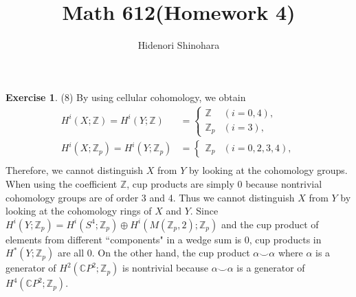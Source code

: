 \documentclass[12pt, psamsfonts]{amsart}
\theoremstyle{definition}
\newtheorem*{exer}{Exercise}
\theoremstyle{remark}
\numberwithin{equation}{section}
\begin{document}
\title{Math 612(Homework 4)}
\author{Hidenori Shinohara}
\maketitle

\begin{exer}{(8)}
  By using cellular cohomology, we obtain 
  \begin{align*}
    H^i(X; \mathbb{Z}) = H^i(Y; \mathbb{Z}) &= \begin{cases}
      \mathbb{Z} & (i = 0, 4), \\
      \mathbb{Z}_p & (i = 3),
    \end{cases} \\
    H^i(X; \mathbb{Z}_p) = H^i(Y; \mathbb{Z}_p) &= \begin{cases}
      \mathbb{Z}_p & (i = 0, 2, 3, 4),
    \end{cases} \\
  \end{align*}
  Therefore, we cannot distinguish $X$ from $Y$ by looking at the cohomology groups.
  When using the coefficient $\mathbb{Z}$, cup products are simply 0 because nontrivial cohomology groups are of order 3 and 4.
  Thus we cannot distinguish $X$ from $Y$ by looking at the cohomology rings of $X$ and $Y$.
  Since $H^i(Y; \mathbb{Z}_p) = H^i(S^4; \mathbb{Z}_p) \oplus H^i(M(\mathbb{Z}_p, 2); \mathbb{Z}_p)$ and the cup product of elements from different ``components" in a wedge sum is 0, cup products in $H^{\ast}(Y; \mathbb{Z}_p)$ are all 0.
  On the other hand, the cup product $\alpha \smile \alpha$ where $\alpha$ is a generator of $H^2(\mathbb{C}P^2; \mathbb{Z}_p)$ is nontrivial because $\alpha \smile \alpha$ is a generator of $H^4(\mathbb{C}P^2; \mathbb{Z}_p)$.
\end{exer}
\end{document}
